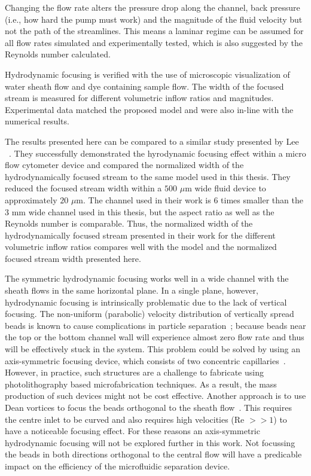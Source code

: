 Changing the flow rate alters the pressure drop along the channel, back pressure (i.e., how hard the pump must work) and the magnitude of the fluid velocity but not the path of the streamlines. This means a laminar regime can be assumed for all flow rates simulated and experimentally tested, which is also suggested by the Reynolds number calculated.

Hydrodynamic focusing is verified with the use of microscopic visualization of water sheath flow and dye containing sample flow. The width of the focused stream is measured for different volumetric inflow ratios and magnitudes. Experimental data matched the proposed model and were also in-line with the numerical results. 

The results presented here can be compared to a similar study presented by Lee \etal{}~\cite{Lee2006}. They successfully demonstrated the hyrodynamic focusing effect within a micro flow cytometer device and compared the normalized width of the hydrodynamically focused stream to the same model used in this thesis. They reduced the focused stream width within a $500$ $\mu$m wide fluid device to approximately $20$ $\mu$m. The channel used in their work is $6$ times smaller than the $3$ mm wide channel used in this thesis, but the aspect ratio as well as the Reynolds number is comparable. Thus, the normalized width of the hydrodynamically focused stream presented in their work for the different volumetric inflow ratios compares well with the model and the normalized focused stream width presented here.

The symmetric hydrodynamic focusing works well in a wide channel with the sheath flows in the same horizontal plane. In a single plane, however, hydrodynamic focusing is intrinsically problematic due to the lack of vertical focusing. The non-uniform (parabolic) velocity distribution of vertically spread beads is known to cause complications in particle separation~\cite{Wolff2003}; because beads near the top or the bottom channel wall will experience almost zero flow rate and thus will be effectively stuck in the system. This problem could be solved by using an axis-symmetric focusing device, which consists of two concentric capillaries~\cite{Takeuchi2005,Paie2014,Harold2014}. However, in practice, such structures are a challenge to fabricate using photolithography based microfabrication techniques. As a result, the mass production of such devices might not be cost effective. Another approach is to use Dean vortices to focus the beads orthogonal to the sheath flow~\cite{Mao2007,Daniele2015}. This requires the centre inlet to be curved and also requires high velocities (Re $>> 1$) to have a noticeable focusing effect. For these reasons an axis-symmetric hydrodynamic focusing will not be explored further in this work. Not focussing the beads in both directions orthogonal to the central flow will have a predicable impact on the efficiency of the microfluidic separation device. 
